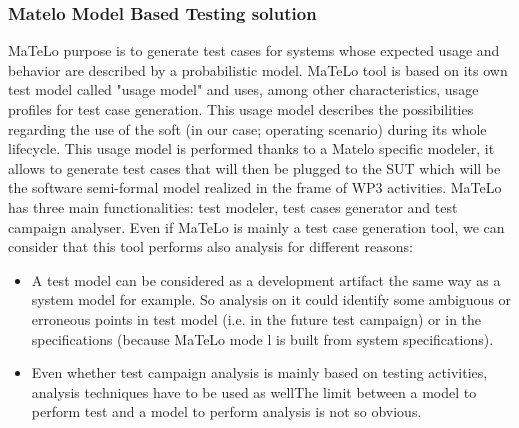 \documentclass{template/openetcs_report}
\begin{document}
\subsubsection{Matelo Model Based Testing solution}
MaTeLo purpose is to generate test cases for systems whose expected usage and 
behavior are described by a probabilistic model. MaTeLo tool is based on its own test
 model called "usage model" and uses, among other characteristics, usage profiles for 
test case generation. This usage model describes the possibilities regarding the use of 
the soft (in our case; operating scenario) during its whole lifecycle. This usage model is
 performed thanks to a Matelo specific modeler, it allows to generate test cases that will 
then be plugged to the SUT which will be the software semi-formal model realized in the 
frame of WP3 activities.
MaTeLo has three main functionalities: test modeler, test cases generator and test campaign
 analyser. Even if MaTeLo is mainly a test case generation tool, we can consider that this
 tool performs also analysis for different reasons:
\begin{itemize}
\item A test model can be considered as a development artifact the same way as a system
 model for example. So analysis on it could identify some ambiguous or erroneous points in
 test model (i.e. in the future test campaign) or in the specifications (because MaTeLo mode
l is built from system specifications).
\item Even whether test campaign analysis is mainly based on testing activities, analysis
 techniques have to be used as wellThe limit between a model to perform test and a model
 to perform analysis is not so obvious.
\end{itemize}
\end{document}
